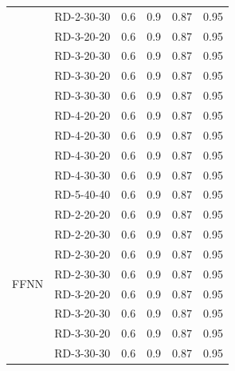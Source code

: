 \begin{table}[ht]
\begin{tabular}{c c c c c c}
                                        & RD-2-30-30 & 0.6             & 0.9         & 0.87     & 0.95     \\
                                        & RD-3-20-20 & 0.6             & 0.9         & 0.87     & 0.95     \\
                                        & RD-3-20-30 & 0.6             & 0.9         & 0.87     & 0.95     \\
                                        & RD-3-30-20 & 0.6             & 0.9         & 0.87     & 0.95     \\
                                        & RD-3-30-30 & 0.6             & 0.9         & 0.87     & 0.95     \\
                                        & RD-4-20-20 & 0.6             & 0.9         & 0.87     & 0.95     \\
                                        & RD-4-20-30 & 0.6             & 0.9         & 0.87     & 0.95     \\
                                        & RD-4-30-20 & 0.6             & 0.9         & 0.87     & 0.95     \\
                                        & RD-4-30-30 & 0.6             & 0.9         & 0.87     & 0.95     \\
                                        & RD-5-40-40 & 0.6             & 0.9         & 0.87     & 0.95     \\
        \midrule
        \multirow{13}{*}{\gls{FFNN}}    & RD-2-20-20 & 0.6             & 0.9         & 0.87     & 0.95     \\
                                        & RD-2-20-30 & 0.6             & 0.9         & 0.87     & 0.95     \\
                                        & RD-2-30-20 & 0.6             & 0.9         & 0.87     & 0.95     \\
                                        & RD-2-30-30 & 0.6             & 0.9         & 0.87     & 0.95     \\
                                        & RD-3-20-20 & 0.6             & 0.9         & 0.87     & 0.95     \\
                                        & RD-3-20-30 & 0.6             & 0.9         & 0.87     & 0.95     \\
                                        & RD-3-30-20 & 0.6             & 0.9         & 0.87     & 0.95     \\
                                        & RD-3-30-30 & 0.6             & 0.9         & 0.87     & 0.95     \\

\end{tabular}
\end{table}

